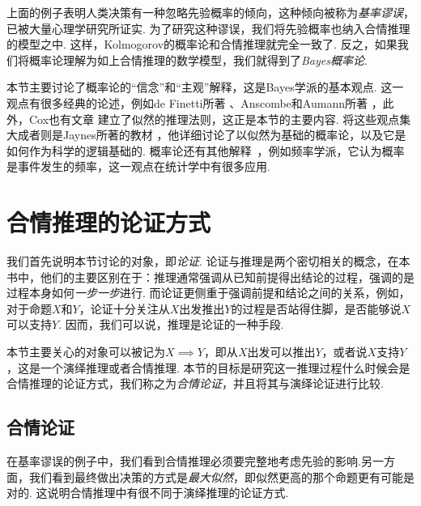 上面的例子表明人类决策有一种忽略先验概率的倾向，这种倾向被称为\textit{基率谬误}，已被大量心理学研究所证实\cite{kahnemanPsychologyPrediction1973,tverskyJudgmentUncertaintyHeuristics1974,bar-hillelBaserateFallacyProbability1980}. 为了研究这种谬误，我们将先验概率也纳入合情推理的模型之中. 这样，Kolmogorov的概率论和合情推理就完全一致了. 反之，如果我们将概率论理解为如上合情推理的数学模型，我们就得到了\textit{Bayes概率论}.

\begin{remark}
    本节主要讨论了概率论的“信念”和“主观”解释，这是Bayes学派的基本观点. 这一观点有很多经典的论述，例如de Finetti所著 \cite{definettiTheoryProbabilityCritical2017}、Anscombe和Aumann所著 \cite{anscombeDefinitionSubjectiveProbability1963}，此外，Cox也有文章 \cite{coxProbabilityFrequencyReasonable1946} 建立了似然的推理法则，这正是本节的主要内容. 将这些观点集大成者则是Jaynes所著的教材 \cite{jaynesProbabilityTheoryLogic2002}，他详细讨论了以似然为基础的概率论，以及它是如何作为科学的逻辑基础的. 概率论还有其他解释~\cite{hajekInterpretationsProbability2023}，例如频率学派，它认为概率是事件发生的频率，这一观点在统计学中有很多应用.
\end{remark}

\section{合情推理的论证方式}

我们首先说明本节讨论的对象，即\textit{论证}. 论证与推理是两个密切相关的概念，在本书中，他们的主要区别在于：推理通常强调从已知前提得出结论的过程，强调的是过程本身如何\textit{一步一步}进行. 而论证更侧重于强调前提和结论之间的关系，例如，对于命题$X$和$Y$，论证十分关注从$X$出发推出$Y$的过程是否站得住脚，是否能够说$X$可以支持$Y$. 因而，我们可以说，推理是论证的一种手段. 

本节主要关心的对象可以被记为$X\implies Y$，即从$X$出发可以推出$Y$，或者说$X$支持$Y$，这是一个演绎推理或者合情推理. 本节的目标是研究这一推理过程什么时候会是合情推理的论证方式，我们称之为\textit{合情论证}，并且将其与演绎论证进行比较.

\subsection{合情论证}\label{subsec:inductive-strong-argument}

在基率谬误的例子中，我们看到合情推理必须要完整地考虑先验的影响.另一方面，我们看到最终做出决策的方式是\textit{最大似然}，即似然更高的那个命题更有可能是对的. 这说明合情推理中有很不同于演绎推理的论证方式.





